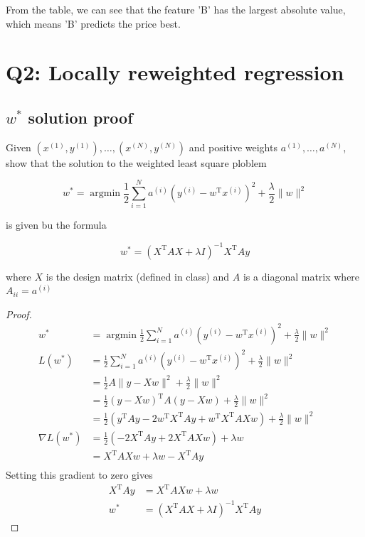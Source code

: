 \documentclass[a4paper]{article}
\begin{document}
From the table, we can see that the feature 'B' has the largest absolute value, which means 'B' predicts the price best.

\section{Q2: Locally reweighted regression}

\subsection{$w^*$ solution proof}

Given $(x^{(1)}, y^{(1)}), \dots, (x^{(N)}, y^{(N)})$ and positive weights $a^{(1)}, \dots, a^{(N)}$, show that the solution to the weighted least square ploblem

\begin{equation}
    w^*=\operatorname{argmin}\frac{1}{2}\sum_{i=1}^Na^{(i)}(y^{(i)}-w^\mathrm{T}x^{(i)})^2+\frac{\lambda}{2}\|w\|^2
\end{equation}

is given bu the formula

\begin{equation}
    w^*=(X^\mathrm{T}AX+\lambda I)^{-1}X^\mathrm{T}Ay
\end{equation}

where $X$ is the design matrix (defined in class) and $A$ is a diagonal matrix where $A_{ii}=a^{(i)}$

\begin{proof}
    \begin{align*}
        w^*&=\operatorname{argmin}\frac{1}{2}\sum_{i=1}^Na^{(i)}(y^{(i)}-w^\mathrm{T}x^{(i)})^2+\frac{\lambda}{2}\|w\|^2\\
        L(w^*)&=\frac{1}{2}\sum_{i=1}^Na^{(i)}(y^{(i)}-w^\mathrm{T}x^{(i)})^2+\frac{\lambda}{2}\|w\|^2\\
        &=\frac{1}{2}A\|y-Xw\|^2+\frac{\lambda}{2}\|w\|^2\\
        &=\frac{1}{2}(y-Xw)^\mathrm{T}A(y-Xw)+\frac{\lambda}{2}\|w\|^2\\
        &=\frac{1}{2}(y^\mathrm{T}Ay-2w^\mathrm{T}X^\mathrm{T}Ay+w^\mathrm{T}X^\mathrm{T}AXw)+\frac{\lambda}{2}\|w\|^2\\
        \nabla L(w^*)&=\frac{1}{2}(-2X^\mathrm{T}Ay+2X^\mathrm{T}AXw)+\lambda w\\
        &=X^\mathrm{T}AXw+\lambda w-X^\mathrm{T}Ay\\
    \end{align*}
    \qquad Setting this gradient to zero gives
    \begin{align*}
        X^\mathrm{T}Ay&=X^\mathrm{T}AXw+\lambda w\\
        w^*&=(X^\mathrm{T}AX+\lambda I)^{-1}X^\mathrm{T}Ay
    \end{align*}
\end{proof}
\end{document}
